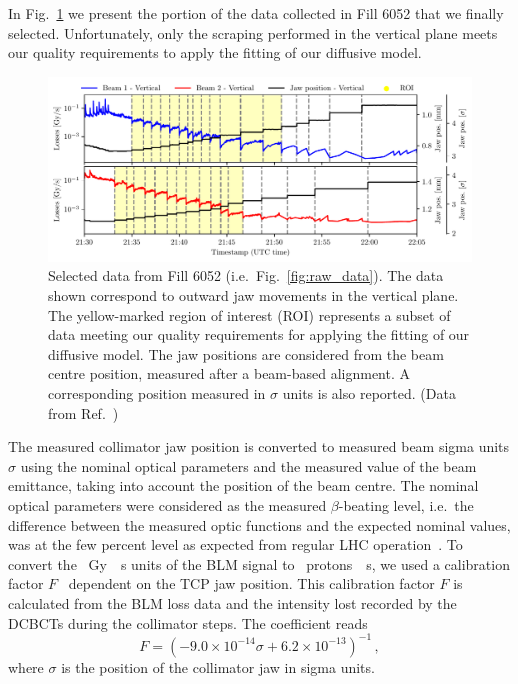 In Fig.~\ref{fig:first} we present the portion of the data collected in Fill 6052 that we finally selected. Unfortunately, only the scraping performed in the vertical plane meets our quality requirements to apply the fitting of our diffusive model.

\begin{figure}[hpt]
    \centering
    \includegraphics[width=\textwidth]{5_Diffusion_measurement_LHC/figs/first.pdf}
    \caption{Selected data from Fill 6052 (i.e.\ Fig.~\ref{fig:raw_data}). The data shown correspond to outward jaw movements in the vertical plane. The yellow-marked region of interest (ROI) represents a subset of data meeting our quality requirements for applying the fitting of our diffusive model. The jaw positions are considered from the beam centre position, measured after a beam-based alignment. A corresponding position measured in $\sigma$ units is also reported. (Data from Ref.~\cite{PhysRevAccelBeams.23.044802})}
    \label{fig:first}
\end{figure}

The measured collimator jaw position is converted to measured beam sigma units $\sigma$ using the nominal optical parameters and the measured value of the beam emittance, taking into account the position of the beam centre. The nominal optical parameters were considered as the measured $\beta$-beating level, i.e.\ the difference between the measured optic functions and the expected nominal values, was at the few percent level as expected from regular LHC operation~\cite{PhysRevAccelBeams.20.054801}.  To convert the \SI{}{Gy \per s} units of the BLM signal to \SI{}{protons \per s}, we used a calibration factor $F$~\cite{arek} dependent on the TCP jaw position. This calibration factor $F$ is calculated from the BLM loss data and the intensity lost recorded by the DCBCTs during the collimator steps. The coefficient reads 
\begin{equation}
    F = \left(-9.0\times10^{-14}\sigma + 6.2\times10^{-13}\right)^{-1} \,,
\end{equation}
where $\sigma$ is the position of the collimator jaw in sigma units.

